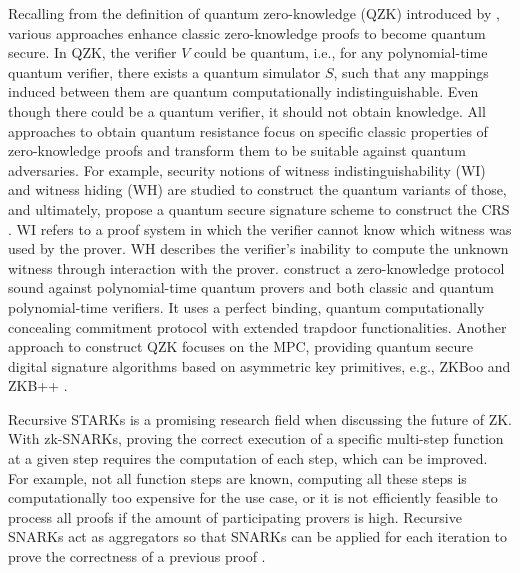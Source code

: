 Recalling from the definition of quantum zero-knowledge (QZK) introduced by \citet{watrousqzk}, various approaches enhance classic zero-knowledge proofs to become quantum secure. In QZK, the verifier \(V\) could be quantum, i.e., for any polynomial-time quantum verifier, there exists a quantum simulator \(S\), such that any mappings induced between them are quantum computationally indistinguishable. Even though there could be a quantum verifier, it should not obtain knowledge. All approaches to obtain quantum resistance focus on specific classic properties of zero-knowledge proofs and transform them to be suitable against quantum adversaries. For example, security notions of witness indistinguishability (WI) and witness hiding (WH) are studied to construct the quantum variants of those, and ultimately, propose a quantum secure signature scheme to construct the CRS \citep{xieyang2019, katzetal}. WI refers to a proof system in which the verifier cannot know which witness was used by the prover. WH describes the verifier's inability to compute the unknown witness through interaction with the prover. \citet{Vidick2020classicalzero} construct a zero-knowledge protocol sound against polynomial-time quantum provers and both classic and quantum polynomial-time verifiers. It uses a perfect binding, quantum computationally concealing commitment protocol with extended trapdoor functionalities. Another approach to construct QZK focuses on the MPC, providing quantum secure digital signature algorithms based on asymmetric key primitives, e.g., ZKBoo and ZKB++ \citep{gongetal}.

Recursive STARKs is a promising research field when discussing the future of ZK. With zk-SNARKs, proving the correct execution of a specific multi-step function at a given step requires the computation of each step, which can be improved. For example, not all function steps are known, computing all these steps is computationally too expensive for the use case, or it is not efficiently feasible to process all proofs if the amount of participating provers is high. Recursive SNARKs act as aggregators so that SNARKs can be applied for each iteration to prove the correctness of a previous proof \citep{chen2022review}.

